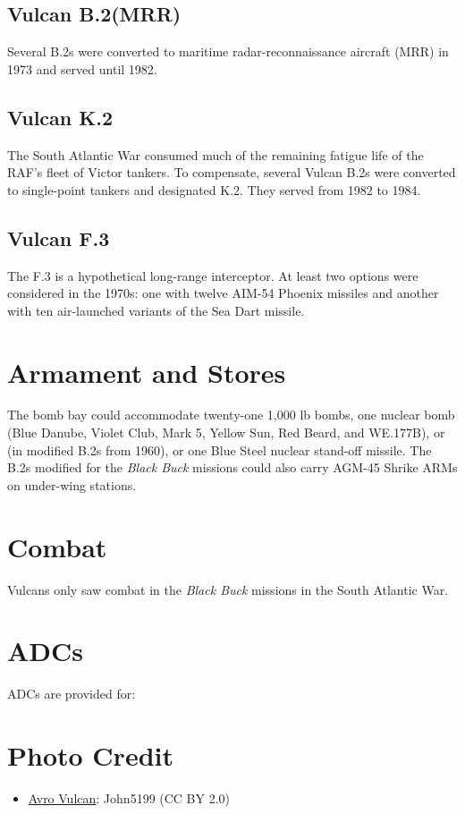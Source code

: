 \subsection{Vulcan B.2(MRR)}

Several B.2s were converted to maritime radar-reconnaissance aircraft (MRR) in 1973 and served until 1982.

\subsection{Vulcan K.2}

The South Atlantic War consumed much of the remaining fatigue life of the RAF's fleet of Victor tankers. To compensate, several Vulcan B.2s were converted to single-point tankers and designated K.2. They served from 1982 to 1984.

\subsection{Vulcan F.3}

The F.3 is a hypothetical long-range interceptor. At least two options were considered in the 1970s: one with twelve AIM-54 Phoenix missiles and another with ten air-launched variants of the Sea Dart missile.

\section{Armament and Stores}

The bomb bay could accommodate twenty-one 1,000 lb bombs, one nuclear bomb (Blue Danube, Violet Club, Mark 5, Yellow Sun, Red Beard, and WE.177B), or (in modified B.2s from 1960), or one Blue Steel nuclear stand-off missile. The B.2s modified for the {\itshape Black Buck} missions could also carry AGM-45 Shrike ARMs on under-wing stations.

\section{Combat}

Vulcans only saw combat in the {\itshape Black Buck} missions in the South Atlantic War.

\section{ADCs}

ADCs are provided for:
\begin{itemize}
\end{itemize}

\section{Photo Credit}
\begin{itemize}\raggedright
    \item \href{https://commons.wikimedia.org/wiki/File:Avro_Vulcan_XH558_Duxford_Airshow_2012_(7977149648).jpg}{Avro Vulcan}: John5199 (CC BY 2.0)
\end{itemize}
